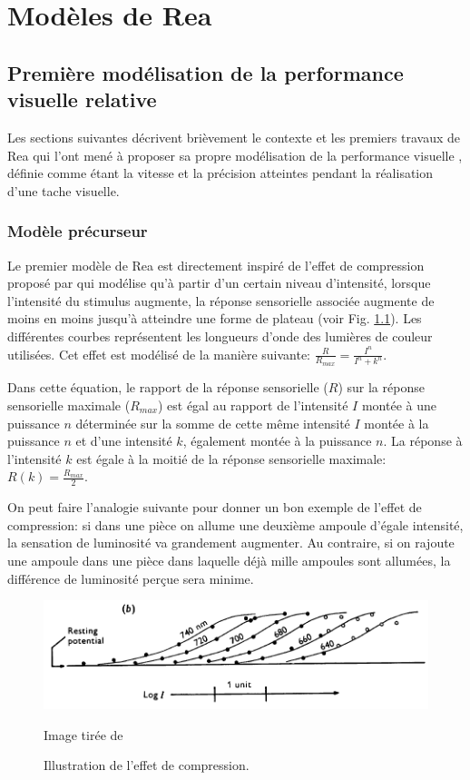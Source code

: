 \chapter{Modèles de Rea}
	\section{Première modélisation de la performance visuelle relative}
	\par Les sections suivantes décrivent brièvement le contexte et les premiers travaux de Rea qui l'ont mené à proposer sa propre modélisation de la performance visuelle \citep{rea_toward_1986, rea_toward_1987}, définie comme étant la vitesse et la précision atteintes pendant la réalisation d'une tache visuelle.
	
	\subsection{Modèle précurseur}	
	\par Le premier modèle de Rea est directement inspiré de l'effet de compression proposé par \cite{naka_attempt_1966} qui modélise qu'à partir d'un certain niveau d'intensité, lorsque l'intensité du stimulus augmente, la réponse sensorielle associée augmente de moins en moins jusqu'à atteindre une forme de plateau (voir Fig. \ref{fig:compression_effect}). Les différentes courbes représentent les longueurs d'onde des lumières de couleur utilisées. Cet effet est modélisé de la manière suivante: $\frac{R}{R_{max}} = \frac{I^n}{I^n + k^n}$.
	
	\par Dans cette équation, le rapport de la réponse sensorielle ($R$) sur la réponse sensorielle maximale ($R_{max}$) est égal au rapport de l'intensité $I$ montée à une puissance $n$ déterminée sur la somme de cette même intensité $I$ montée à la puissance $n$ et d'une intensité $k$, également montée à la puissance $n$. La réponse à l'intensité $k$ est égale à la moitié de la réponse sensorielle maximale: $R(k) = \frac{R_{max}}{2}$.
	
	\par On peut faire l'analogie suivante pour donner un bon exemple de l'effet de compression: si dans une pièce on allume une deuxième ampoule d'égale intensité, la sensation de luminosité va grandement augmenter. Au contraire, si on rajoute une ampoule dans une pièce dans laquelle déjà mille ampoules sont allumées, la différence de luminosité perçue sera minime.	
	
	\begin{figure}
		\centering
		\includegraphics[scale=.6]{Figures/CompressionEffect}
		\caption{Illustration de l'effet de compression.}{Image tirée de \citep{naka_attempt_1966}}
		\label{fig:compression_effect}
	\end{figure} 
	

